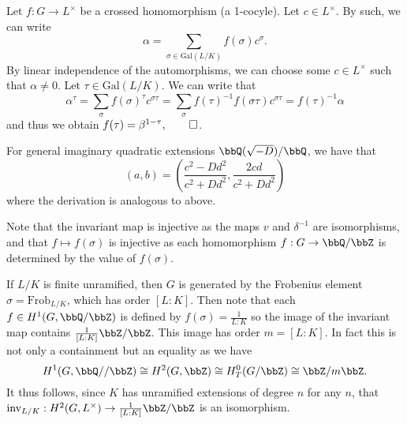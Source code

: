 \documentclass[a4paper, 12pt,oneside,openany]{book}
\begin{document}
Let $f: G\to L^\times$ be a crossed homomorphism (a 1-cocyle). Let $c \in L^\times$. By such, we can write $$\alpha = \sum\limits_{\sigma \in \text{Gal}(L/K)} f(\sigma)c^{\sigma}.$$ By linear independence of the automorphisms, we can choose some $c \in L^\times$ such that $\alpha \neq 0$. Let $\tau \in \text{Gal}(L/K)$. We can write that $$\alpha^\tau = \sum\limits_\sigma f(\sigma)^\tau c^{\sigma\tau} = \sum\limits_\sigma f(\tau)^{-1}f(\sigma\tau)c^{\sigma\tau} = f(\tau)^{-1} \alpha$$ and thus we obtain $f(\tau)=\beta^{1-\tau}, \qed$. 


For general imaginary quadratic extensions $\bbQ(\sqrt{-D})/\bbQ$, we have that $$(a, b) = \left( \frac{c^2-Dd^2}{c^2+Dd^2}, \frac{2cd}{c^2+Dd^2} \right)$$ where the derivation is analogous to above.


 Note that the invariant map is injective as the maps $v$ and $\delta^{-1}$ are isomorphisms, and that $f \mapsto f(\sigma)$ is injective as each homomorphism $f:G\to\bbQ/\bbZ$ is determined by the value of $f(\sigma)$.

If $L/K$ is finite unramified, then $G$ is generated by the Frobenius element $\sigma = \text{Frob}_{L/K}$, which has order $[L:K]$. Then note that each $f \in H^1(G, \bbQ/\bbZ)$ is defined by $f(\sigma)=\frac{1}{L:K}$ so the image of the invariant map contains $\frac{1}{[L:K]}\bbZ/\bbZ$. This image has order $m=[L:K]$. In fact this is not only a containment but an equality as we have $$H^1(G, \bbQ//\bbZ) \cong H^2(G, \bbZ) \cong H^0_T(G/\bbZ) \cong \bbZ/m\bbZ.$$ It thus follows, since $K$ has unramified extensions of degree $n$ for any $n$, that $\text{inv}_{L/K}:H^2(G, L^\times) \to \frac{1}{[L:K]}\bbZ/\bbZ$ is an isomorphism.
\end{document}

